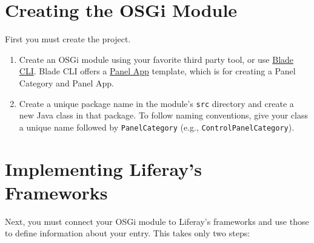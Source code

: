 \section{Creating the OSGi Module}\label{creating-the-osgi-module}

First you must create the project.

\begin{enumerate}
\def\labelenumi{\arabic{enumi}.}
\item
  Create an OSGi module using your favorite third party tool, or use
  \href{/docs/7-2/reference/-/knowledge_base/r/blade-cli}{Blade CLI}.
  Blade CLI offers a
  \href{/docs/7-2/reference/-/knowledge_base/r/panel-app-template}{Panel
  App} template, which is for creating a Panel Category and Panel App.
\item
  Create a unique package name in the module's \texttt{src} directory
  and create a new Java class in that package. To follow naming
  conventions, give your class a unique name followed by
  \texttt{PanelCategory} (e.g., \texttt{ControlPanelCategory}).
\end{enumerate}

\section{Implementing Liferay's
Frameworks}\label{implementing-liferays-frameworks}

Next, you must connect your OSGi module to Liferay's frameworks and use
those to define information about your entry. This takes only two steps:

